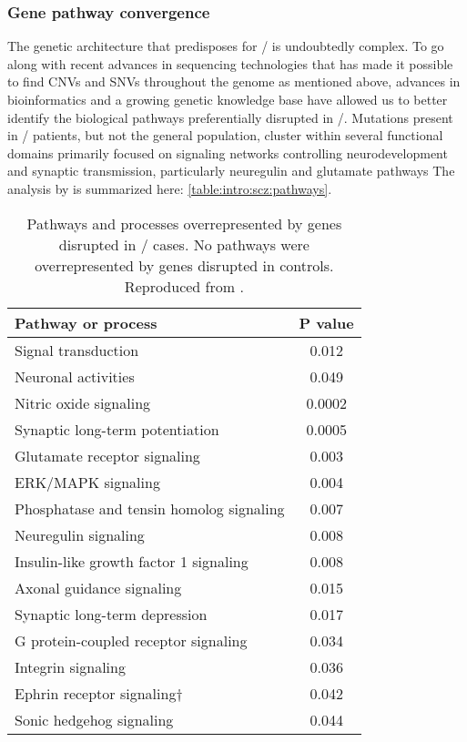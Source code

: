 
\subsubsection{Gene pathway convergence}
The genetic architecture that predisposes for \scz/ is undoubtedly complex.
To go along with recent advances in sequencing technologies that has made it possible to find CNVs and SNVs throughout the genome as mentioned above, advances in bioinformatics and a growing genetic knowledge base have allowed us to better identify the biological pathways preferentially disrupted in \scz/.
Mutations present in \scz/ patients, but not the general population, cluster within several functional domains primarily focused on signaling networks controlling neurodevelopment and synaptic transmission, particularly neuregulin and glutamate pathways \citep{Walsh2008, Glessner2010}
The analysis by \citeauthor{Walsh2008} is summarized here: \autoref{table:intro:scz:pathways}.

\begin{table}
\centering
\begin{tabular}{l c}
\textbf{Pathway or process} & \textbf{P value} \\
\hline
Signal transduction & 0.012 \\
Neuronal activities & 0.049 \\
Nitric oxide signaling & 0.0002 \\
Synaptic long-term potentiation & 0.0005 \\
Glutamate receptor signaling & 0.003 \\
ERK/MAPK signaling & 0.004 \\
Phosphatase and tensin homolog signaling & 0.007 \\
Neuregulin signaling & 0.008 \\
Insulin-like growth factor 1 signaling & 0.008 \\
Axonal guidance signaling & 0.015 \\
Synaptic long-term depression & 0.017 \\
G protein-coupled receptor signaling & 0.034 \\
Integrin signaling & 0.036 \\
Ephrin receptor signaling† & 0.042 \\
Sonic hedgehog signaling & 0.044 \\
\end{tabular}
\caption[Pathways implicated in \scz/]{Pathways and processes overrepresented by genes disrupted in \scz/ cases. No pathways were overrepresented by genes disrupted in controls.
Reproduced from \citet{Walsh2008}.}
\label{table:intro:scz:pathways}
\end{table}

